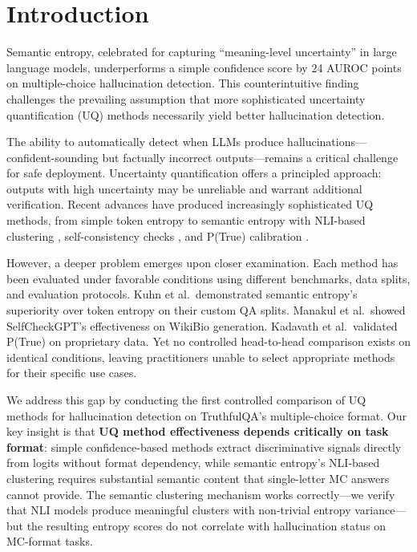\section{Introduction}

Semantic entropy, celebrated for capturing ``meaning-level uncertainty'' in large language models, underperforms a simple confidence score by 24 AUROC points on multiple-choice hallucination detection. This counterintuitive finding challenges the prevailing assumption that more sophisticated uncertainty quantification (UQ) methods necessarily yield better hallucination detection.

The ability to automatically detect when LLMs produce hallucinations---confident-sounding but factually incorrect outputs---remains a critical challenge for safe deployment. Uncertainty quantification offers a principled approach: outputs with high uncertainty may be unreliable and warrant additional verification. Recent advances have produced increasingly sophisticated UQ methods, from simple token entropy to semantic entropy with NLI-based clustering \cite{kuhn2023semantic}, self-consistency checks \cite{manakul2023selfcheckgpt}, and P(True) calibration \cite{kadavath2022language}.

However, a deeper problem emerges upon closer examination. Each method has been evaluated under favorable conditions using different benchmarks, data splits, and evaluation protocols. Kuhn et al.\ demonstrated semantic entropy's superiority over token entropy on their custom QA splits. Manakul et al.\ showed SelfCheckGPT's effectiveness on WikiBio generation. Kadavath et al.\ validated P(True) on proprietary data. Yet no controlled head-to-head comparison exists on identical conditions, leaving practitioners unable to select appropriate methods for their specific use cases.

We address this gap by conducting the first controlled comparison of UQ methods for hallucination detection on TruthfulQA's multiple-choice format. Our key insight is that \textbf{UQ method effectiveness depends critically on task format}: simple confidence-based methods extract discriminative signals directly from logits without format dependency, while semantic entropy's NLI-based clustering requires substantial semantic content that single-letter MC answers cannot provide. The semantic clustering mechanism works correctly---we verify that NLI models produce meaningful clusters with non-trivial entropy variance---but the resulting entropy scores do not correlate with hallucination status on MC-format tasks.

